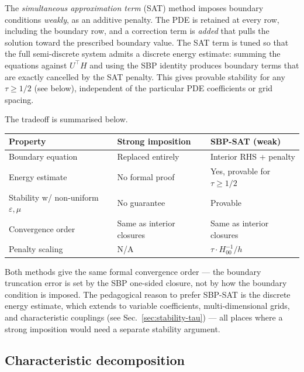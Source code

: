 \documentclass[11pt]{article}
\newcommand{\eps}{\varepsilon}
\begin{document}
The \emph{simultaneous approximation term} (SAT) method imposes boundary
conditions \emph{weakly}, as an additive penalty. The PDE is retained
at every row, including the boundary row, and a correction term is
\emph{added} that pulls the solution toward the prescribed boundary
value. The SAT term is tuned so that the full semi-discrete system
admits a discrete energy estimate: summing the equations against
$U^\top H$ and using the SBP identity produces boundary terms that
are exactly cancelled by the SAT penalty. This gives provable stability
for any $\tau \geq 1/2$ (see below), independent of the particular
PDE coefficients or grid spacing.

The tradeoff is summarised below.

\begin{center}
\begin{tabular}{lll}
\toprule
Property                       & Strong imposition            & SBP-SAT (weak)      \\
\midrule
Boundary equation              & Replaced entirely            & Interior RHS + penalty \\
Energy estimate                & No formal proof              & Yes, provable for $\tau \geq 1/2$ \\
Stability w/ non-uniform $\eps, \mu$ & No guarantee                 & Provable \\
Convergence order              & Same as interior closures    & Same as interior closures \\
Penalty scaling                & N/A                          & $\tau \cdot H^{-1}_{00}/h$ \\
\bottomrule
\end{tabular}
\end{center}

Both methods give the same formal convergence order — the boundary
truncation error is set by the SBP one-sided closure, not by how the
boundary condition is imposed. The pedagogical reason to prefer
SBP-SAT is the discrete energy estimate, which extends to variable
coefficients, multi-dimensional grids, and characteristic couplings
(see Sec.~\ref{sec:stability-tau}) — all places where a strong
imposition would need a separate stability argument.

\subsection{Characteristic decomposition}
\label{sec:characteristics}
\end{document}
